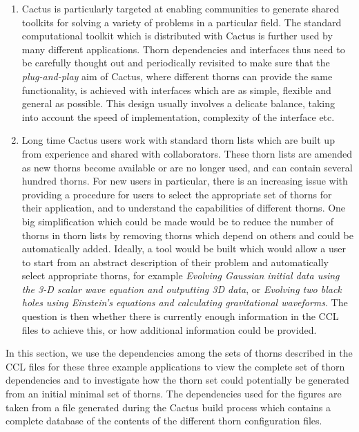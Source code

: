 \documentclass[conference]{IEEEtran}
\begin{document}
\begin{enumerate}

\item Cactus is particularly targeted at enabling communities to generate shared toolkits for solving a variety of problems in a particular field. The standard computational toolkit which is distributed with Cactus is further used by many different applications. Thorn dependencies and interfaces thus need to be carefully thought out and periodically revisited to make sure that the {\it plug-and-play} aim of Cactus, where different thorns can provide the same functionality, is achieved with interfaces which are as simple, flexible and general as possible. This design usually involves a delicate balance, taking into account   the speed of implementation, complexity of the interface etc.

\item Long time Cactus users work with standard thorn lists which are built up from experience and shared with collaborators. These thorn lists are amended as new thorns become available or are no longer used, and can contain several hundred thorns. For new users in particular, there is an 
increasing issue with providing a procedure for users to select the appropriate set of thorns for their application, and to understand the capabilities of different thorns. One big simplification which could be made would be to reduce the number of thorns in thorn lists by removing thorns which depend on others and could be automatically added. Ideally, a tool would be built which would allow a user to start from an abstract description of their problem and automatically select appropriate thorns, for example {\it Evolving Gaussian initial data using the 3-D scalar wave equation and outputting 3D data}, or {\it Evolving two black holes using Einstein's equations and calculating gravitational waveforms}. The question is then whether there is currently enough information in the CCL files to achieve this, or how additional information could be provided.

\end{enumerate}

In this section, we use the dependencies among the sets of thorns described in the CCL files for these three example applications to view 
the complete set of thorn dependencies and to investigate how the thorn set could potentially be generated from an initial minimal set of 
thorns. The dependencies used for the figures are taken from a file generated during the Cactus build process which contains a complete database 
of the contents of the different thorn configuration files. 
\end{document}
